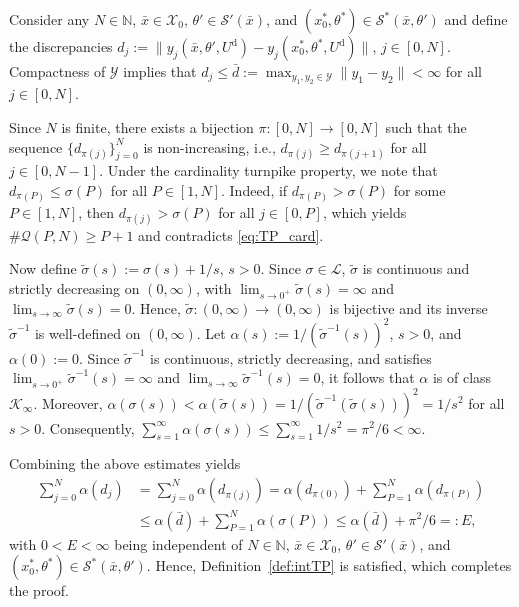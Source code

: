 \documentclass[a4paper,fleqn]{cas-dc}
\begin{document}
\begin{pf}
	Consider any $N\in\mathbb{N}$, $\bar{x}\in\mathcal{X}_0$, $\theta'\in\mathcal{S}'(\bar{x})$, and $(x_0^*,\theta^*)\in\mathcal{S}^*(\bar{x},\theta')$ and define the discrepancies $d_j := \|y_j(\bar{x},\theta',U^\mathrm{d})-y_j(x_0^*,\theta^*,U^\mathrm{d})\|$, $j\in[0,N]$.
	Compactness of $\mathcal{Y}$ implies that $d_j\leq \bar{d}:= \max_{y_1,y_2\in\mathcal{Y}}\|y_1-y_2\|<\infty$ for all $j\in[0,N]$.
	
	Since $N$ is finite, there exists a bijection $\pi:[0,N]\rightarrow[0,N]$ such that the sequence $\{d_{\pi(j)}\}_{j=0}^N$ is non-increasing, i.e., $d_{\pi(j)}\geq d_{\pi(j+1)}$ for all $j\in[0,N-1]$.
	Under the cardinality turnpike property, we note that $d_{\pi(P)}\leq \sigma(P)$ for all $P\in[1,N]$.
	Indeed, if $d_{\pi(P)}>\sigma(P)$ for some $P\in[1,N]$,	then $d_{\pi(j)}>\sigma(P)$ for all $j\in[0,P]$, which yields $\#\mathcal{Q}(P,N)\geq P+1$ and contradicts \eqref{eq:TP_card}.
	
	Now define $\tilde{\sigma}(s) := \sigma(s) + 1/s$, $s> 0$. Since $\sigma\in\mathcal{L}$, $\tilde{\sigma}$ is continuous and strictly decreasing on $(0,\infty)$, with $\lim_{s \to 0^+}\tilde{\sigma}(s)=\infty$ and $\lim_{s \to \infty}\tilde{\sigma}(s)=0$. Hence, $\tilde{\sigma}:(0,\infty)\rightarrow(0,\infty)$ is bijective and its inverse $\tilde{\sigma}^{-1}$ is well-defined on $(0,\infty)$.
	Let $\alpha(s):={1}/{(\tilde{\sigma}^{-1}(s))^{2}}$, $s>0$, and $\alpha(0):=0$.
	Since $\tilde{\sigma}^{-1}$ is continuous, strictly decreasing, and satisfies $\lim_{s \to 0^+}\tilde{\sigma}^{-1}(s)=\infty$ and $\lim_{s \to \infty}\tilde{\sigma}^{-1}(s)=0$, it follows that $\alpha$ is of class $\mathcal{K}_\infty$.
	Moreover, $\alpha({\sigma}(s))<\alpha(\tilde{\sigma}(s)) = {1}/{(\tilde{\sigma}^{-1}(\tilde{\sigma}(s)))^{2}} = 1/s^2$ for all $s>0$. Consequently,
	$\sum_{s=1}^\infty\alpha({\sigma}(s)) \leq \sum_{s=1}^\infty{1}/{s^2} = {\pi^2}/{6} < \infty$.

	Combining the above estimates yields
	\begin{equation*}
	\begin{split}
		\sum_{j=0}^N\alpha(d_j) &= \sum_{j=0}^N\alpha(d_{\pi(j)})= \alpha(d_{\pi(0)}) + \sum_{P=1}^N\alpha(d_{\pi(P)})\\
		&\leq \alpha(\bar{d}) + \sum_{P=1}^N\alpha(\sigma(P))
		\leq \alpha(\bar{d}) + \pi^2/6 =:E,
	\end{split}
	\end{equation*}
	with $0<E<\infty$ being independent of $N\in\mathbb{N}$, $\bar{x}\in\mathcal{X}_0$, $\theta'\in\mathcal{S}'(\bar{x})$, and $(x_0^*,\theta^*)\in\mathcal{S}^*(\bar{x},\theta')$. Hence, Definition~\ref{def:intTP}
	is satisfied, which completes the proof.
\end{pf}
\end{document}
